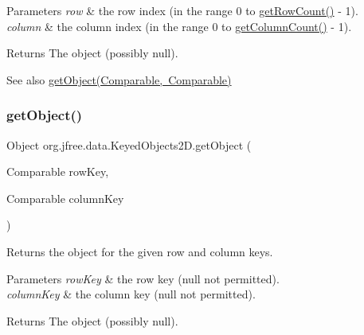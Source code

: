 \begin{DoxyParams}{Parameters}
{\em row} & the row index (in the range 0 to \mbox{\hyperlink{classorg_1_1jfree_1_1data_1_1_keyed_objects2_d_acc38620c65b59e8ea4caa08e99901f53}{get\+Row\+Count()}} -\/ 1). \\
\hline
{\em column} & the column index (in the range 0 to \mbox{\hyperlink{classorg_1_1jfree_1_1data_1_1_keyed_objects2_d_a5278f36b18983c828dabc81392d30552}{get\+Column\+Count()}} -\/ 1).\\
\hline
\end{DoxyParams}
\begin{DoxyReturn}{Returns}
The object (possibly {\ttfamily null}).
\end{DoxyReturn}
\begin{DoxySeeAlso}{See also}
\mbox{\hyperlink{classorg_1_1jfree_1_1data_1_1_keyed_objects2_d_aec253fd1e311efac7c8897f366482f28}{get\+Object(\+Comparable, Comparable)}} 
\end{DoxySeeAlso}
\mbox{\label{classorg_1_1jfree_1_1data_1_1_keyed_objects2_d_aec253fd1e311efac7c8897f366482f28}} 
\subsubsection{\texorpdfstring{get\+Object()}{getObject()}\hspace{0.1cm}{\footnotesize\ttfamily [2/2]}}
{\footnotesize\ttfamily Object org.\+jfree.\+data.\+Keyed\+Objects2\+D.\+get\+Object (\begin{DoxyParamCaption}\item[{Comparable}]{row\+Key,  }\item[{Comparable}]{column\+Key }\end{DoxyParamCaption})}

Returns the object for the given row and column keys.


\begin{DoxyParams}{Parameters}
{\em row\+Key} & the row key ({\ttfamily null} not permitted). \\
\hline
{\em column\+Key} & the column key ({\ttfamily null} not permitted).\\
\hline
\end{DoxyParams}
\begin{DoxyReturn}{Returns}
The object (possibly {\ttfamily null}).
\end{DoxyReturn}

